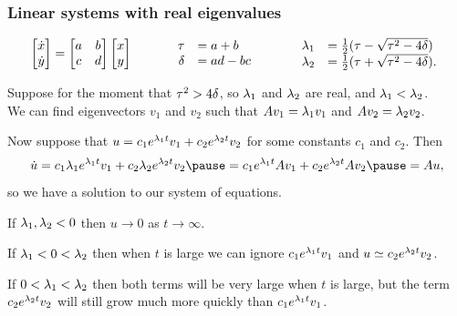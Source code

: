 \documentclass[9pt]{beamer}
\begin{document}
\begin{frame}[t]
 \frametitle{Linear systems with real eigenvalues}
 \[ \left[\begin{matrix} \dot{x}\\ \dot{y}\end{matrix}\right]=\left[\begin{matrix} a&b\\ c&d\end{matrix}\right]\left[\begin{matrix} x\\ y\end{matrix}\right]
    \hspace{3em}
    \begin{array}{rl}
     \tau &= a+b \\ \delta &= ad-bc
    \end{array}
    \hspace{3em}
    \begin{array}{rl}
     \lambda_1 &= \tfrac{1}{2}(\tau - \sqrt{\tau^2-4\delta}) \\
     \lambda_2 &= \tfrac{1}{2}(\tau + \sqrt{\tau^2-4\delta}).
    \end{array}
 \]

 \reminderbar

 Suppose for the moment that $\tau^2>4\delta$, so $\lambda_1$ and $\lambda_2$ are
 real, and $\lambda_1<\lambda_2$.  \\ \pause
 We can find eigenvectors $v_1$ and $v_2$
 such that $Av_1=\lambda_1v_1$ and $Av_2=\lambda_2v_2$.  \pause

 \medskip

 Now suppose that $u=c_1e^{\lambda_1t}v_1+c_2e^{\lambda_2t}v_2$ for some
 constants $c_1$ and $c_2$.  \pause Then 
 \[ \dot{u} =
    c_1\lm_1e^{\lm_1t}v_1 + c_2\lm_2e^{\lm_2t}v_2 \pause = 
    c_1e^{\lm_1t}Av_1 + c_2e^{\lm_2t}Av_2 \pause = Au,
 \] \pause
 so we have a solution to our system of equations.

 \pause \medskip

 If $\lambda_1,\lambda_2<0$ then $u\to 0$ as $t\to\infty$. \\\pause

 \medskip

 If $\lambda_1<0<\lambda_2$ then when $t$ is large we can ignore
 $c_1e^{\lambda_1t}v_1$ and $u\simeq c_2e^{\lambda_2t}v_2$.\\  \pause 

 \medskip

 If $0<\lambda_1<\lambda_2$ then both terms will be very large when $t$ is
 large, but the term $c_2e^{\lambda_2t}v_2$ will still grow much more
 quickly than $c_1e^{\lambda_1t}v_1$.
\end{frame}
\end{document}
